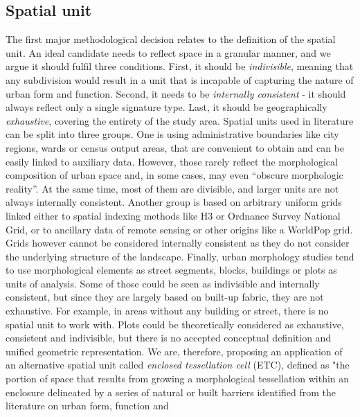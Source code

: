 \documentclass[fleqn,10pt]{wlscirep}
\begin{document}
\subsection*{Spatial unit}
The first major methodological decision relates to the definition of the
spatial unit. An ideal candidate needs to reflect space in a granular manner, and we argue
it should fulfil three conditions. First, it should be \textit{indivisible},
meaning that any subdivision would result in a unit that is incapable of
capturing the nature of urban form and function. Second, it needs to be
\textit{internally consistent} - it should always reflect only a single signature type.
Last, it should be geographically \textit{exhaustive}, covering the entirety of the study
area.
Spatial units used in literature can be split into three groups. One is using
administrative boundaries like city regions\cite{angel2020}, wards or census output areas\cite{alexiou2016}, that are
convenient to obtain and can be easily linked to auxiliary data. However,
those rarely reflect the morphological composition of urban space and, in some cases, may
even “obscure morphologic reality”\cite{taubenbock2019new}. At the same time, most of them
are divisible, and larger units are not always internally consistent. Another group is based on
arbitrary uniform grids linked either to spatial indexing methods like
H3\cite{brodsky2018h3} or Ordnance Survey
National Grid, or to ancillary data of remote sensing or other origins like a
WorldPop grid\cite{jochem2021tools}. Grids however cannot be considered internally
consistent as
they do not consider the underlying structure of the landscape.
Finally, urban morphology studies tend to use morphological elements as
street segments\cite{araldi2019}, blocks\cite{gil2012},
buildings\cite{hamaina2012a} or plots\cite{bobkova2019} as units of analysis.
Some of those
could be seen as indivisible and internally consistent, but since they are largely based
on built-up fabric, they are not exhaustive. For example, in areas without any building or
street, there
is no spatial unit to work with. Plots could be theoretically considered as exhaustive,
consistent and indivisible, but there is no accepted conceptual definition and unified
geometric representation\cite{kropf2018}.
We are, therefore, proposing an application of an alternative spatial unit called \textit{enclosed
tessellation cell} (ETC), defined as "the portion of space that results
from growing a morphological tessellation within an enclosure delineated by a series
of natural or built barriers identified from the literature on urban form, function and
\end{document}
